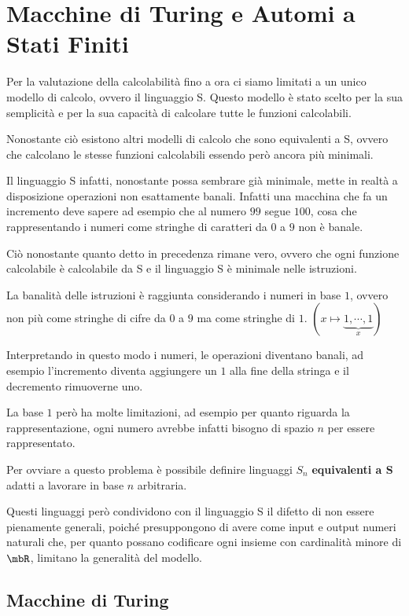 \chapter{Macchine di Turing e Automi a Stati Finiti}

Per la valutazione della calcolabilità fino a ora ci siamo limitati a un unico modello di calcolo, ovvero il linguaggio S. Questo modello è stato scelto per la sua semplicità e per la sua capacità di calcolare tutte le funzioni calcolabili.

Nonostante ciò esistono altri modelli di calcolo che sono equivalenti a S, ovvero che calcolano le stesse funzioni calcolabili essendo però ancora più minimali.

Il linguaggio S infatti, nonostante possa sembrare già minimale, mette in realtà a disposizione operazioni non esattamente banali. Infatti una macchina che fa un incremento deve sapere ad esempio che al numero \(99\) segue \(100\), cosa che rappresentando i numeri come stringhe di caratteri da \(0\) a \(9\) non è banale.

Ciò nonostante quanto detto in precedenza rimane vero, ovvero che ogni funzione calcolabile è calcolabile da S e il linguaggio S è minimale nelle istruzioni.

La banalità delle istruzioni è raggiunta considerando i numeri in base \(1\), ovvero non più come stringhe di cifre da \(0\) a \(9\) ma come stringhe di \(1\).
\((x \mapsto \underbrace{1, \cdots , 1}_x )\)

Interpretando in questo modo i numeri, le operazioni diventano banali, ad esempio l'incremento diventa aggiungere un \(1\) alla fine della stringa e il decremento rimuoverne uno.

La base \(1\) però ha molte limitazioni, ad esempio per quanto riguarda la rappresentazione, ogni numero avrebbe infatti bisogno di spazio \(n\) per essere rappresentato.

Per ovviare a questo problema è possibile definire linguaggi \(S_n\) \textbf{equivalenti a S} adatti a lavorare in base \(n\) arbitraria.

Questi linguaggi però condividono con il linguaggio S il difetto di non essere pienamente generali, poiché presuppongono di avere come input e output numeri naturali che, per quanto possano codificare ogni insieme con cardinalità minore di \(\mbR\), limitano la generalità del modello.

\section{Macchine di Turing}

